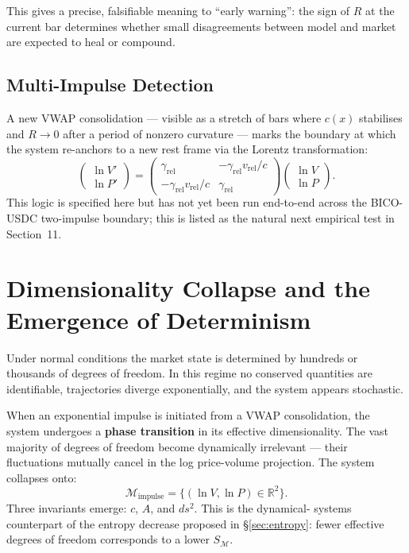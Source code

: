 \documentclass[12pt,a4paper]{article}
\begin{document}
This gives a precise, falsifiable meaning to ``early warning'': the sign
of $R$ at the current bar determines whether small disagreements between
model and market are expected to heal or compound.

\subsection{Multi-Impulse Detection}

A new VWAP consolidation --- visible as a stretch of bars where $c(x)$
stabilises and $R\to0$ after a period of nonzero curvature --- marks the
boundary at which the system re-anchors to a new rest frame via the
Lorentz transformation:
\begin{equation}
    \begin{pmatrix}\ln V'\\\ln P'\end{pmatrix} =
    \begin{pmatrix}\gamma_\text{rel} & -\gamma_\text{rel}v_\text{rel}/c \\
    -\gamma_\text{rel}v_\text{rel}/c & \gamma_\text{rel}\end{pmatrix}
    \begin{pmatrix}\ln V\\\ln P\end{pmatrix}.
\end{equation}
This logic is specified here but has not yet been run end-to-end across
the BICO-USDC two-impulse boundary; this is listed as the natural next
empirical test in Section~11.


\section{Dimensionality Collapse and the Emergence of Determinism}

Under normal conditions the market state is determined by hundreds or
thousands of degrees of freedom. In this regime no conserved quantities
are identifiable, trajectories diverge exponentially, and the system
appears stochastic.

When an exponential impulse is initiated from a VWAP consolidation, the
system undergoes a \textbf{phase transition} in its effective
dimensionality. The vast majority of degrees of freedom become dynamically
irrelevant --- their fluctuations mutually cancel in the log
price-volume projection. The system collapses onto:
\begin{equation}
    \mathcal{M}_{\text{impulse}} = \{(\ln V, \ln P) \in \mathbb{R}^2\}.
\end{equation}
Three invariants emerge: $c$, $A$, and $ds^2$. This is the dynamical-
systems counterpart of the entropy decrease proposed in \S\ref{sec:entropy}:
fewer effective degrees of freedom corresponds to a lower $S_{\mathcal{M}}$.
\end{document}
